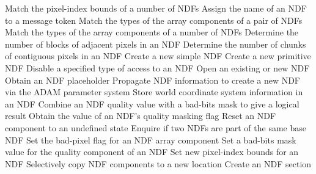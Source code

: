 \begin{latexonly}
            {Match the pixel-index bounds of a number of NDFs}
            {Assign the name of an NDF to a message token}
            {Match the types of the array components of a pair of NDFs}
            {Match the types of the array components of a number of NDFs}
            {Determine the number of blocks of adjacent pixels in an NDF}
            {Determine the number of chunks of contiguous pixels in an NDF}
            {Create a new simple NDF}
            {Create a new primitive NDF}
            {Disable a specified type of access to an NDF}
            {Open an existing or new NDF}
            {Obtain an NDF placeholder}
            {Propagate NDF information to create a new NDF via the ADAM parameter system}
            {Store world coordinate system information in an NDF}
            {Combine an NDF quality value with a bad-bits mask to give a logical result}
            {Obtain the value of an NDF's quality masking flag}
            {Reset an NDF component to an undefined state}
            {Enquire if two NDFs are part of the same base NDF}
            {Set the bad-pixel flag for an NDF array component}
            {Set a bad-bits mask value for the quality component of an NDF}
            {Set new pixel-index bounds for an NDF}
            {Selectively copy NDF components to a new location}
            {Create an NDF section}

\end{latexonly}
